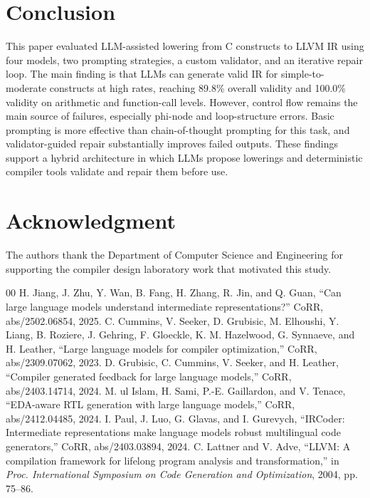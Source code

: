 \documentclass[conference]{IEEEtran}
\begin{document}
\section{Conclusion}
This paper evaluated LLM-assisted lowering from C constructs to LLVM IR using four models, two prompting strategies, a custom validator, and an iterative repair loop. The main finding is that LLMs can generate valid IR for simple-to-moderate constructs at high rates, reaching 89.8\% overall validity and 100.0\% validity on arithmetic and function-call levels. However, control flow remains the main source of failures, especially phi-node and loop-structure errors. Basic prompting is more effective than chain-of-thought prompting for this task, and validator-guided repair substantially improves failed outputs. These findings support a hybrid architecture in which LLMs propose lowerings and deterministic compiler tools validate and repair them before use.

\section*{Acknowledgment}
The authors thank the Department of Computer Science and Engineering for supporting the compiler design laboratory work that motivated this study.

\begin{thebibliography}{00}
 H. Jiang, J. Zhu, Y. Wan, B. Fang, H. Zhang, R. Jin, and Q. Guan, ``Can large language models understand intermediate representations?'' CoRR, abs/2502.06854, 2025.
 C. Cummins, V. Seeker, D. Grubisic, M. Elhoushi, Y. Liang, B. Roziere, J. Gehring, F. Gloeckle, K. M. Hazelwood, G. Synnaeve, and H. Leather, ``Large language models for compiler optimization,'' CoRR, abs/2309.07062, 2023.
 D. Grubisic, C. Cummins, V. Seeker, and H. Leather, ``Compiler generated feedback for large language models,'' CoRR, abs/2403.14714, 2024.
 M. ul Islam, H. Sami, P.-E. Gaillardon, and V. Tenace, ``EDA-aware RTL generation with large language models,'' CoRR, abs/2412.04485, 2024.
 I. Paul, J. Luo, G. Glavas, and I. Gurevych, ``IRCoder: Intermediate representations make language models robust multilingual code generators,'' CoRR, abs/2403.03894, 2024.
 C. Lattner and V. Adve, ``LLVM: A compilation framework for lifelong program analysis and transformation,'' in \textit{Proc. International Symposium on Code Generation and Optimization}, 2004, pp. 75--86.
\end{thebibliography}
\end{document}

